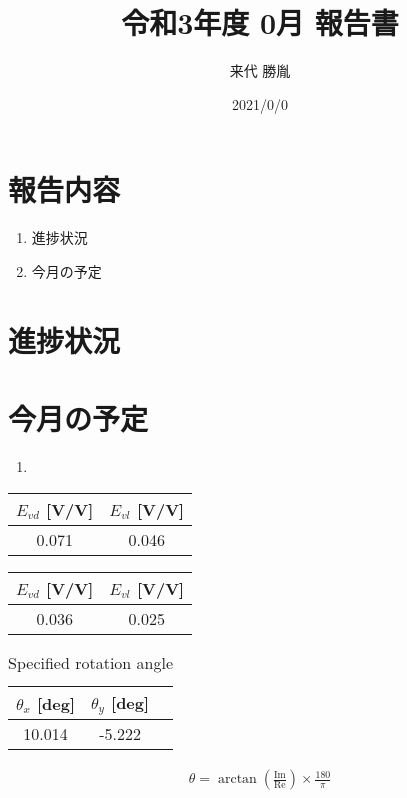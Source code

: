\documentclass[twocolumn,a4j]{jsarticle}
\author{来代 勝胤}
\title{令和3年度 0月 報告書}
\date{2021/0/0}
\begin{document}
\columnseprule=0.1mm
\maketitle
\section*{報告内容}
\begin{enumerate}[1.]
    \item 進捗状況
    \item 今月の予定
\end{enumerate}
\section{進捗状況}
\section{今月の予定}
\begin{enumerate}[1.]
    \item 
\end{enumerate}

\begin{table}[htbp]
    \begin{center}
      \begin{tabular}{|p{20mm}|p{20mm}|}
        \hline
        \multicolumn{1}{|c|}{$E_{vd}$ [V/V]} & \multicolumn{1}{|c|}{$E_{vl}$ [V/V]} \\ \hline
        \multicolumn{1}{|c|}{0.071}          & \multicolumn{1}{|c|}{0.046}          \\ \hline
      \end{tabular}
    \end{center}
\end{table}

\begin{table}[htbp]
  \begin{center}
    \begin{tabular}{|p{20mm}|p{20mm}|}
      \hline
      \multicolumn{1}{|c|}{$E_{vd}$ [V/V]} & \multicolumn{1}{|c|}{$E_{vl}$ [V/V]} \\ \hline
      \multicolumn{1}{|c|}{0.036}          & \multicolumn{1}{|c|}{0.025}          \\ \hline
    \end{tabular}
  \end{center}
\end{table}
    
    \begin{table}[htbp]
        \begin{center}
          \caption{Specified rotation angle}
          \begin{tabular}{|p{30mm}|p{20mm}|p{20mm}|}
            \hline
            \multicolumn{1}{|c|}{$\theta_x$ [deg]} & \multicolumn{1}{|c|}{$\theta_y$ [deg]} \\ \hline
            \multicolumn{1}{|c|}{10.014}            & \multicolumn{1}{|c|}{-5.222}            \\ \hline
          \end{tabular}
        \end{center}
      \end{table}

\begin{eqnarray*}
    \theta = \arctan \left(\frac{\mathrm{Im}}{\mathrm{Re}}\right) \times \frac{180}{\pi}
\end{eqnarray*}
\end{document}
